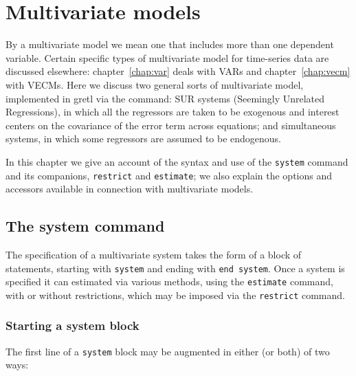 \chapter{Multivariate models}
\label{chap:system}

By a multivariate model we mean one that includes more than one
dependent variable. Certain specific types of multivariate model for
time-series data are discussed elsewhere: chapter~\ref{chap:var} deals
with VARs and chapter~\ref{chap:vecm} with VECMs. Here we discuss two
general sorts of multivariate model, implemented in gretl via
the  command: SUR systems (Seemingly Unrelated
Regressions), in which all the regressors are taken to be exogenous
and interest centers on the covariance of the error term across
equations; and simultaneous systems, in which some regressors are
assumed to be endogenous.

In this chapter we give an account of the syntax and use of the
\texttt{system} command and its companions, \texttt{restrict}
and \texttt{estimate}; we also explain the options and accessors
available in connection with multivariate models.

\section{The system command}
\label{sec:sys-command}

The specification of a multivariate system takes the form of a block
of statements, starting with \texttt{system} and ending with
\texttt{end system}. Once a system is specified it can estimated via
various methods, using the \texttt{estimate} command, with or without
restrictions, which may be imposed via the \texttt{restrict} command.

\subsection{Starting a system block}

The first line of a \texttt{system} block may be augmented in either
(or both) of two ways:

